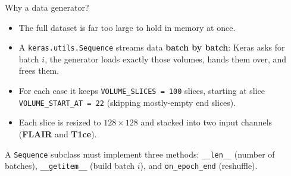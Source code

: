 \documentclass[10pt,aspectratio=169]{beamer}
\begin{document}
\begin{frame}{Why a data generator?}
  \begin{itemize}
    \item The full dataset is far too large to hold in memory at once.
    \item A \texttt{keras.utils.Sequence} streams data \textbf{batch by batch}: Keras asks for batch
          $i$, the generator loads exactly those volumes, hands them over, and frees them.
    \item For each case it keeps \texttt{VOLUME\_SLICES = 100} slices, starting at slice
          \texttt{VOLUME\_START\_AT = 22} (skipping mostly-empty end slices).
    \item Each slice is resized to $128\times128$ and stacked into two input channels
          (\textbf{FLAIR} and \textbf{T1ce}).
  \end{itemize}
  \vspace{0.4em}
  A \texttt{Sequence} subclass must implement three methods: \texttt{\_\_len\_\_} (number of
  batches), \texttt{\_\_getitem\_\_} (build batch $i$), and \texttt{on\_epoch\_end} (reshuffle).
\end{frame}
\end{document}
